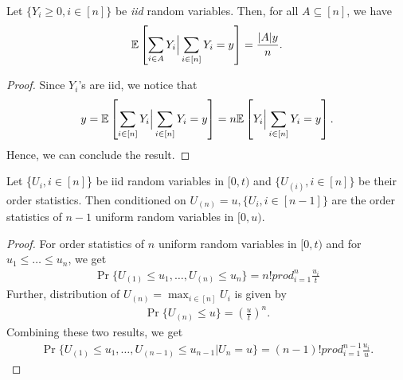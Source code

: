 \documentclass[a4paper,english,10pt]{article}
\begin{document}
\begin{lem}
\label{Lemma:Uniform}
Let $\{Y_i \geq 0,i \in [n]\}$ be \emph{iid} random variables. 
Then, for all $A \subseteq [n]$, we have
\begin{align*}
 \mathbb{E}\left[\sum_{i \in A}Y_i \Big| \sum_{i \in [n]}Y_i=y\right]=\frac{|A|y}{n}.
\end{align*}
\end{lem}
\begin{proof} Since $Y_i$'s are iid, we notice that
\begin{align*}
y = \mathbb{E}\left[\sum_{i \in [n]}Y_i \Big| \sum_{i \in [n]}Y_i=y\right] = n \mathbb{E}\left[Y_i \Big| \sum_{i \in [n]}Y_i=y\right].
\end{align*}
Hence, we can conclude the result.
\end{proof}

\begin{lem}
\label{Lemma:Reduction}
Let \{$U_i,i \in[n]$\} be iid random variables in $[0,t)$ and $\{U_{(i)},i \in [n]\}$ be their order statistics. Then conditioned on $U_{(n)}=u,\{U_i,i \in[n-1]\}$ are the order statistics of $n-1$ uniform random variables in $[0,u)$.
\end{lem}
\begin{proof}
For order statistics of $n$ uniform random variables in $[0,t)$ and for $u_1 \leq \ldots \leq u_n$, we get
\begin{align*}
\Pr\{U_{(1)} \leq u_1, \ldots, U_{(n)} \leq u_n\} = n!prod_{i=1}^{n}\frac{u_i}{t}
\end{align*}
Further, distribution of $U_{(n)} = \max_{i \in [n]} U_i$ is given by 
\begin{align*}
\Pr\{U_{(n)} \leq u\} = \left(\frac{u}{t}\right)^n.
\end{align*}
Combining these two results, we get
\begin{align*}
\Pr\{U_{(1)} \leq u_1, \ldots, U_{(n-1)} \leq u_{n-1} | U_{n} = u\} = (n-1)!prod_{i=1}^{n-1}\frac{u_i}{u}.
\end{align*}
\end{proof}
\end{document}
